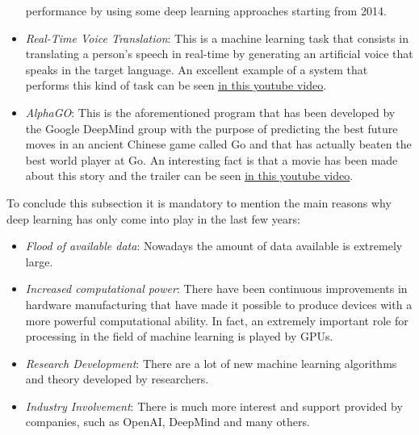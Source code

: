\begin{itemize}
          performance by using some deep learning approaches starting
          from 2014.
    \item \emph{Real-Time Voice Translation}: This is a machine learning
          task that consists in translating a person's speech in
          real-time by generating an artificial voice that speaks in the
          target language. An excellent example of a system that performs
          this kind of task can be seen
          \href{https://www.youtube.com/watch?v=Nu-nlQqFCKg}{\underline{in this youtube video}}.
    \item \emph{AlphaGO}: This is the aforementioned program that has
          been developed by the Google DeepMind group with the purpose
          of predicting the best future moves in an ancient Chinese game
          called Go and that has actually beaten the best world player
          at Go. An interesting fact is that a movie has been made about
          this story and the trailer can be seen
          \href{https://www.youtube.com/watch?v=8tq1C8spV_g}{\underline{in this youtube video}}.
\end{itemize}

\newpage

To conclude this subsection it is mandatory to mention the main reasons
why deep learning has only come into play in the last few years:

\begin{itemize}
    \item \emph{Flood of available data}: Nowadays the amount of data
          available is extremely large.
    \item \emph{Increased computational power}: There have been
          continuous improvements in hardware manufacturing that
          have made it possible to produce devices with a more powerful
          computational ability. In fact, an extremely important role
          for processing in the field of machine learning is played by
          GPUs.
    \item \emph{Research Development}: There are a lot of new machine
          learning algorithms and theory developed by researchers.
    \item \emph{Industry Involvement}: There is much more interest and
          support provided by companies, such as OpenAI, DeepMind and
          many others.
\end{itemize}